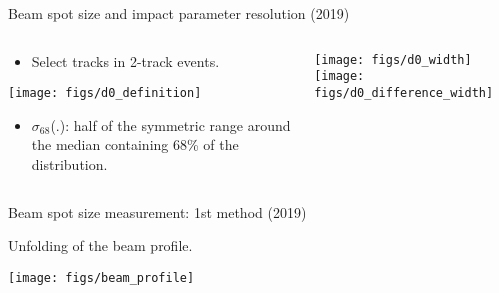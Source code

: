 \begin{frame}{Beam spot size and impact parameter resolution  (2019) }%
\begin{columns}
\begin{column}{0.5\linewidth} 
\begin{itemize} 
\vspace{-0.4cm}
\item \small Select tracks in 2-track events.
\vspace{0.2cm}
\end{itemize}

\hfill
\vspace{0.2cm}
\texttt{[image: figs/d0\_definition]} 
\begin{itemize} 
\item \small $\sigma_{68}$(.): half of the symmetric range around the median containing 68\% of the distribution.
\end{itemize}
\end{column}
\begin{column}{0.45\linewidth}
\texttt{[image: figs/d0\_width]} 
\texttt{[image: figs/d0\_difference\_width]} 
\end{column}
\end{columns}
\end{frame}
\begin{frame}{Beam spot size measurement: 1st method  (2019) }%
\bi
\item Unfolding of the beam profile.
\ei
{}
\centering
\texttt{[image: figs/beam\_profile]} 
\end{frame}
